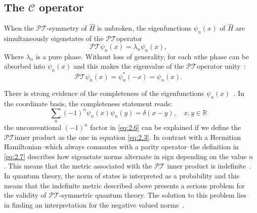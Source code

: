 \documentclass[12pt, a4paper]{report}
\newcommand\PT{\(\mathcal{PT}\)}
\begin{document}
\subsection{The $\mathcal{C}$ operator}\label{CC}
When the \PT-symmetry of $\hat{H}$ is unbroken, the eigenfunctions $\psi_n(x)$ of $\hat{H}$ are simultaneously eigenstates of the \PT\:operator~\cite{Bender_2004}
\begin{equation}\label{eq:2.4}
\mathcal{PT}\psi_n(x) = \lambda_n \psi_n(x),
\end{equation}
Where $\lambda_n$ is a pure phase. Without loss of generality, for each $n$\:the phase can be absorbed into $\psi_n(x)$ and this makes the eigenvalue of the \PT operator unity~\cite{Bender_2004}: 
\begin{equation}\label{eq:2.5}
\mathcal{PT}\psi_n(x) = \psi_{n}^{*}(-x) = \psi_n(x).
\end{equation}

There is strong evidence of the completeness of the eigenfunctions $\psi_n(x)$~\cite{ComplexExtension, Bender_2004, Brody_2013}. In the coordinate basis, the completeness statement reads:
\begin{equation}\label{eq:2.6}
\sum_{n}(-1)^{n}\psi_n(x)\psi_n(y) = \delta(x-y),\quad x, y \in \mathbb{R}
\end{equation}
the unconventional $(-1)^n$ factor in \ref{eq:2.6} can be explained if we define the \PT\:inner product as the one in equation \ref{eq:2.3}. In contrast with a Hermitian Hamiltonian--which always commutes with a parity operator--the definition in \ref{eq:2.7} describes how eigenstate norms alternate in sign depending on the value $n$. 
This means that the metric associated with the \PT\: inner product is indefinite~\cite{Bender_2004,Critique}.
In quantum theory, the norm of states is interpreted as a probability and this means that the indefinite metric described above presents a serious problem for the validity of \PT-symmetric quantum theory. The solution to this problem lies in finding an interpretation for the negative valued norms~\cite{PTsymmetricQM}.
\end{document}
